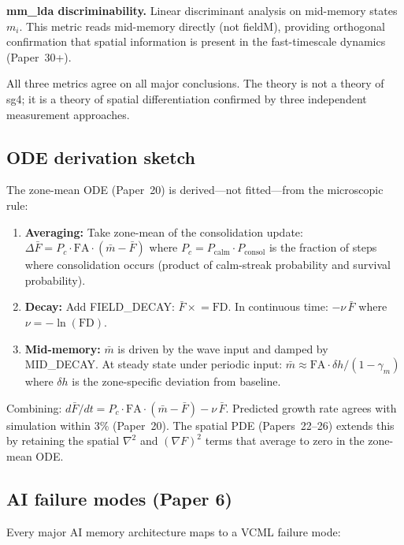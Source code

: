 \documentclass[11pt]{article}
\begin{document}
\textbf{mm\_lda discriminability.}
Linear discriminant analysis on mid-memory states $m_i$.
This metric reads mid-memory directly (not fieldM), providing orthogonal confirmation
that spatial information is present in the fast-timescale dynamics (Paper~30+).

All three metrics agree on all major conclusions.
The theory is not a theory of sg4; it is a theory of spatial differentiation confirmed
by three independent measurement approaches.

\subsection{ODE derivation sketch}

The zone-mean ODE (Paper~20) is derived---not fitted---from the microscopic rule:

\begin{enumerate}
\item \textbf{Averaging:} Take zone-mean of the consolidation update:
  $\Delta \bar{F} = P_c \cdot \mathrm{FA} \cdot (\bar{m} - \bar{F})$
  where $P_c = P_\mathrm{calm} \cdot P_\mathrm{consol}$ is the fraction of steps where
  consolidation occurs (product of calm-streak probability and survival probability).
\item \textbf{Decay:} Add FIELD\_DECAY: $\bar{F} \mathrel{\times}= \mathrm{FD}$.
  In continuous time: $-\nu\,\bar{F}$ where $\nu = -\ln(\mathrm{FD})$.
\item \textbf{Mid-memory:} $\bar{m}$ is driven by the wave input and damped by MID\_DECAY.
  At steady state under periodic input: $\bar{m} \approx \mathrm{FA} \cdot \delta h / (1-\gamma_m)$
  where $\delta h$ is the zone-specific deviation from baseline.
\end{enumerate}

Combining: $d\bar{F}/dt = P_c \cdot \mathrm{FA} \cdot (\bar{m} - \bar{F}) - \nu\,\bar{F}$.
Predicted growth rate agrees with simulation within 3\% (Paper~20).
The spatial PDE (Papers~22--26) extends this by retaining the spatial $\nabla^2$ and $(\nabla F)^2$
terms that average to zero in the zone-mean ODE.

\subsection{AI failure modes (Paper 6)}

Every major AI memory architecture maps to a VCML failure mode:
\end{document}
